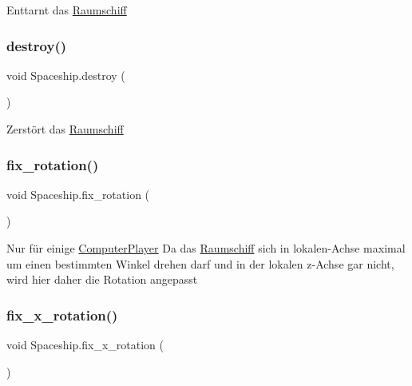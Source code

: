Enttarnt das \hyperlink{class_raumschiff}{Raumschiff} 

\mbox{\label{class_spaceship_a720b65b98cede503822fcb0141873f97}} 
\subsubsection{\texorpdfstring{destroy()}{destroy()}}
{\footnotesize\ttfamily void Spaceship.\+destroy (\begin{DoxyParamCaption}{ }\end{DoxyParamCaption})}



Zerstört das \hyperlink{class_raumschiff}{Raumschiff} 

\mbox{\label{class_spaceship_afd788bbc8497cb88acb1c4633a3b1bb3}} 
\subsubsection{\texorpdfstring{fix\+\_\+rotation()}{fix\_rotation()}}
{\footnotesize\ttfamily void Spaceship.\+fix\+\_\+rotation (\begin{DoxyParamCaption}{ }\end{DoxyParamCaption})}



Nur für einige \hyperlink{class_computer_player}{Computer\+Player} Da das \hyperlink{class_raumschiff}{Raumschiff} sich in lokalen-\/\+Achse maximal um einen bestimmten Winkel drehen darf und in der lokalen z-\/\+Achse gar nicht, wird hier daher die Rotation angepasst 

\mbox{\label{class_spaceship_af4e61eb0614f6933afff28f8f12bbdb9}} 
\subsubsection{\texorpdfstring{fix\+\_\+x\+\_\+rotation()}{fix\_x\_rotation()}}
{\footnotesize\ttfamily void Spaceship.\+fix\+\_\+x\+\_\+rotation (\begin{DoxyParamCaption}{ }\end{DoxyParamCaption})}



